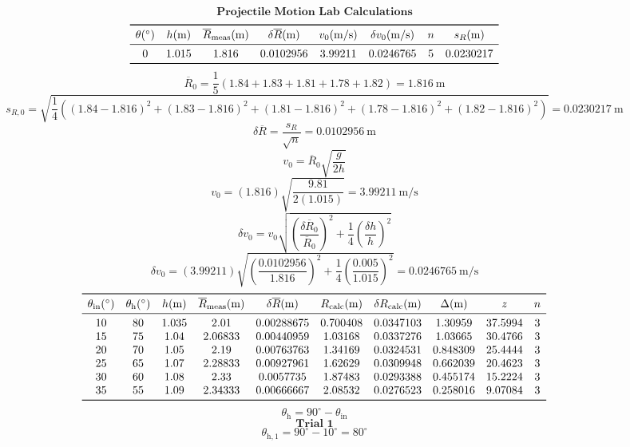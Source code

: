 \documentclass[11pt]{article}
\begin{document}
\scriptsize
\[
\textbf{Projectile Motion Lab Calculations}
\]
\[
\begin{array}{cccccccc}
\toprule
\theta(^\circ) & h(\mathrm{m}) & \overline{R}_{\mathrm{meas}}(\mathrm{m}) & \delta \overline{R}(\mathrm{m}) & v_0(\mathrm{m/s}) & \delta v_0(\mathrm{m/s}) & n & s_R(\mathrm{m})\\
\midrule
0 & 1.015 & 1.816 & 0.0102956 & 3.99211 & 0.0246765 & 5 & 0.0230217 \\
\bottomrule
\end{array}
\]
\[
\overline{R}_0 = \frac{1}{5}\left(1.84 + 1.83 + 1.81 + 1.78 + 1.82\right) = 1.816\ \mathrm{m}
\]
\[
s_{R,0} = \sqrt{\frac{1}{4}\left((1.84 - 1.816)^2 + (1.83 - 1.816)^2 + (1.81 - 1.816)^2 + (1.78 - 1.816)^2 + (1.82 - 1.816)^2\right)} = 0.0230217\ \mathrm{m}
\]
\[
\delta \overline{R} = \dfrac{s_R}{\sqrt{n}} = 0.0102956\ \mathrm{m}
\]
\[
v_0 = \overline{R}_0\sqrt{\frac{g}{2h}}
\]
\[
v_0 = (1.816)\sqrt{\frac{9.81}{2(1.015)}} = 3.99211\ \mathrm{m/s}
\]
\[
\delta v_0 = v_0\sqrt{\left(\frac{\delta \overline{R}_0}{\overline{R}_0}\right)^2 + \frac{1}{4}\left(\frac{\delta h}{h}\right)^2}
\]
\[
\delta v_0 = (3.99211)\sqrt{\left(\frac{0.0102956}{1.816}\right)^2 + \frac{1}{4}\left(\frac{0.005}{1.015}\right)^2} = 0.0246765\ \mathrm{m/s}
\]
\[
\begin{array}{cccccccccc}
\toprule
\theta_{\mathrm{in}}(^\circ) & \theta_{\mathrm{h}}(^\circ) & h(\mathrm{m}) & \overline{R}_{\mathrm{meas}}(\mathrm{m}) & \delta \overline{R}(\mathrm{m}) & R_{\mathrm{calc}}(\mathrm{m}) & \delta R_{\mathrm{calc}}(\mathrm{m}) & \Delta(\mathrm{m}) & z & n\\
\midrule
10 & 80 & 1.035 & 2.01 & 0.00288675 & 0.700408 & 0.0347103 & 1.30959 & 37.5994 & 3 \\
15 & 75 & 1.04 & 2.06833 & 0.00440959 & 1.03168 & 0.0337276 & 1.03665 & 30.4766 & 3 \\
20 & 70 & 1.05 & 2.19 & 0.00763763 & 1.34169 & 0.0324531 & 0.848309 & 25.4444 & 3 \\
25 & 65 & 1.07 & 2.28833 & 0.00927961 & 1.62629 & 0.0309948 & 0.662039 & 20.4623 & 3 \\
30 & 60 & 1.08 & 2.33 & 0.0057735 & 1.87483 & 0.0293388 & 0.455174 & 15.2224 & 3 \\
35 & 55 & 1.09 & 2.34333 & 0.00666667 & 2.08532 & 0.0276523 & 0.258016 & 9.07084 & 3 \\
\bottomrule
\end{array}
\]
\[
\theta_{\mathrm{h}} = 90^{\circ} - \theta_{\mathrm{in}}
\]
\[
\textbf{Trial 1}
\]
\[
\theta_{\mathrm{h},1} = 90^\circ - 10^\circ = 80^\circ
\]
\end{document}
